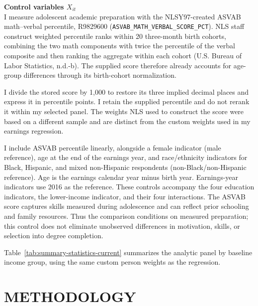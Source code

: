 \documentclass[12pt,letterpaper]{article}
\begin{document}
\textbf{Control variables $X_{it}$}\\
I measure adolescent academic preparation with the NLSY97-created ASVAB
math--verbal percentile, R9829600
(\texttt{ASVAB\_MATH\_VERBAL\_SCORE\_PCT}). NLS staff construct weighted 
percentile ranks within 20 three-month birth cohorts, combining the two math 
components with twice the percentile of the verbal composite and then ranking 
the aggregate within each cohort (U.S. Bureau of Labor Statistics, n.d.-b). 
The supplied score therefore already accounts for age-group differences through
its birth-cohort normalization.\newline

I divide the stored score by 1,000 to restore its three implied decimal places and
express it in percentile points. I retain the supplied percentile and do not rerank
it within my selected panel. The weights NLS used to construct the score were based
on a different sample and are
distinct from the custom weights used in my earnings regression.\newline

I include ASVAB percentile linearly, alongside a female indicator (male reference),
age at the end of the earnings year, and race/ethnicity indicators for Black,
Hispanic, and mixed non-Hispanic respondents (non-Black/non-Hispanic reference).
Age is the earnings calendar year minus birth year. Earnings-year indicators use
2016 as the reference. These controls accompany the four education indicators,
the lower-income indicator, and their four interactions. The ASVAB score captures skills measured during
adolescence and can reflect prior schooling and family resources. Thus the
comparison conditions on measured preparation; this control does not eliminate
unobserved differences in motivation, skills, or selection into degree completion.\newline

Table~\ref{tab:summary-statistics-current} summarizes the analytic panel by baseline
income group, using the same custom person weights as the regression.

\FloatBarrier

\section*{METHODOLOGY}
\end{document}
